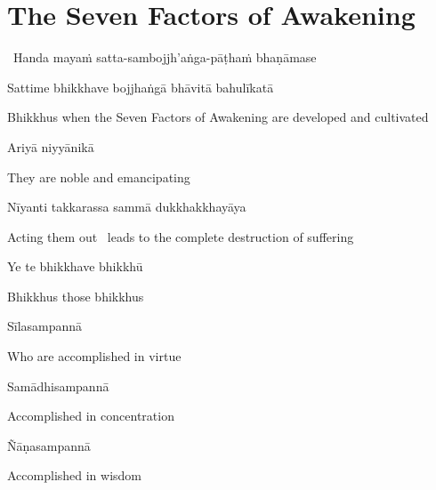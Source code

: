 \suttaRef{[DN 16]}


\section{The Seven Factors of Awakening}
\label{seven-factors-of-awakening}

\begin{leader}
  \anglebracketleft\ \hspace{-0.5mm}Handa mayaṁ satta-sambojjh'aṅga-pāṭhaṁ bhaṇāmase \hspace{-0.5mm}\anglebracketright\
\end{leader}

Sattime bhikkhave bojjhaṅgā bhāvitā bahulīkatā

\begin{english-hang}
  Bhikkhus when the Seven Factors of Awakening are developed and cultivated
\end{english-hang}

Ariyā niyyānikā

\begin{english}
  They are noble and emancipating
\end{english}

Nīyanti takkarassa sammā dukkhakkhayāya

\begin{english}
  Acting them out \breathmark\ leads to the complete destruction of suffering
\end{english}

\suttaRef{[SN 46.19]}

Ye te bhikkhave bhikkhū

\begin{english}
  Bhikkhus those bhikkhus
\end{english}

Sīlasampannā

\begin{english}
  Who are accomplished in virtue
\end{english}

Samādhisampannā

\begin{english}
  Accomplished in concentration
\end{english}

Ñāṇasampannā

\begin{english}
  Accomplished in wisdom
\end{english}


